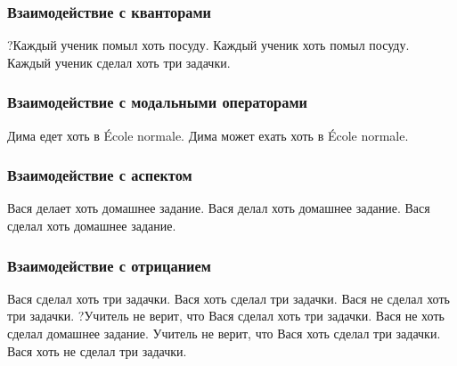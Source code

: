 \documentclass[a4paper, titlepage, 12pt]{article}
\begin{document}
\subsubsection{Взаимодействие с кванторами}

\begin{exe}
    \ex \begin{xlist}
        \ex ?Каждый ученик помыл хоть посуду.
        \ex Каждый ученик хоть помыл посуду.
        \ex Каждый ученик сделал хоть три задачки.
    \end{xlist}
\end{exe}

\subsubsection{Взаимодействие с модальными операторами}

\begin{exe}
    \ex \begin{xlist}
        \ex *Дима едет хоть в École normale.
        \ex Дима может ехать хоть в École normale.
    \end{xlist}
\end{exe}

\subsubsection{Взаимодействие с аспектом}

\begin{exe}
    \ex \begin{xlist}
        \ex *Вася делает хоть домашнее задание.
        \ex *Вася делал хоть домашнее задание.
        \ex Вася сделал хоть домашнее задание.
    \end{xlist}
\end{exe}

\subsubsection{Взаимодействие с отрицанием}

\begin{exe}
    \ex \begin{xlist}
        \ex Вася сделал хоть три задачки.
        \ex Вася хоть сделал три задачки.
        \ex *Вася не сделал хоть три задачки.
        \ex ?Учитель не верит, что Вася сделал хоть три задачки.
        \ex *Вася не хоть сделал домашнее задание.
        \ex *Учитель не верит, что Вася хоть сделал три задачки.
        \ex Вася хоть не сделал три задачки.
    \end{xlist}
\end{exe}

\newpage
 

\end{document}
